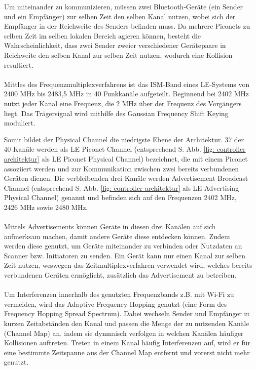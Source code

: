 Um miteinander zu kommunizieren, müssen zwei Bluetooth-Geräte (ein Sender und ein Empfänger) zur selben Zeit den selben Kanal nutzen, wobei sich der Empfänger in der Reichweite des Senders befinden muss. Da mehrere Piconets zu selben Zeit im selben lokalen Bereich agieren können, besteht die Wahrscheinlichkeit, dass zwei Sender zweier verschiedener Gerätepaare in Reichweite den selben Kanal zur selben Zeit nutzen, wodurch eine Kollision resultiert.
\\\\
Mittles des Frequenzmultiplexverfahrens ist das ISM-Band eines LE-Systems von 2400 MHz bis 2483,5 MHz in 40 Funkkanäle aufgeteilt. Beginnend bei 2402 MHz nutzt jeder Kanal eine Frequenz, die 2 MHz über der Frequenz des Vorgängers liegt. Das Trägersignal wird mithilfe des Gaussian Frequency Shift Keying moduliert. \cite{BtSpec4.0_2180-2181}

Somit bildet der Physical Channel die niedrigste Ebene der Architektur. 37 der 40 Kanäle werden als LE Piconet Channel (entsprechend S. \pageref{fig: controller architektur} Abb. \ref{fig: controller architektur} als LE Piconet Physical Channel) bezeichnet, die mit einem Piconet assoziiert werden und zur Kommunikation zwischen zwei bereits verbundenen Geräten dienen. Die verbleibenden drei Kanäle werden Advertisement Broadcast Channel (entsprechend S. \pageref{fig: controller architektur} Abb. \ref{fig: controller architektur} als LE Advertising Physical Channel) genannt und befinden sich auf den Frequenzen 2402 MHz, 2426 MHz sowie 2480 MHz. \cite{BtSpec4.0_2199}
\\\\
Mittels Advertisements können Geräte in diesen drei Kanälen auf sich aufmerksam machen, damit andere Geräte diese entdecken können. Zudem werden diese genutzt, um Geräte miteinander zu verbinden oder Nutzdaten an Scanner bzw. Initiatoren zu senden. Ein Gerät kann nur einen Kanal zur selben Zeit nutzen, weswegen das Zeitmultiplexverfahren verwendet wird, welches bereits verbundenen Geräten ermöglicht, zusätzlich das Advertisement zu betreiben.
\\\\
Um Interferenzen innerhalb des genutzten Frequenzbands z.B. mit Wi-Fi zu vermeiden, wird das Adaptive Frequency Hopping \cite{BtAfh} genutzt (eine Form des Frequency Hopping Spread Spectrum). Dabei wechseln Sender und Empfänger in kurzen Zeitabständen den Kanal und passen die Menge der zu nutzenden Kanäle (Channel Map) an, indem sie dynmaisch verfolgen in welchen Kanälen häufiger Kollisionen auftreten. Treten in einem Kanal häufig Interferenzen auf, wird er für eine bestimmte Zeitspanne aus der Channel Map entfernt und vorerst nicht mehr genutzt.
